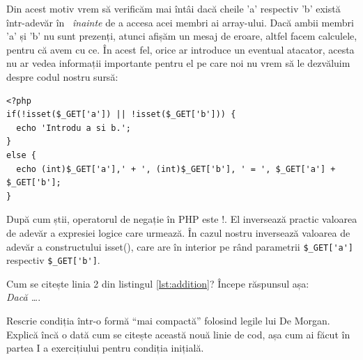 Din acest motiv vrem să verificăm mai întâi
dacă cheile 'a' respectiv 'b' există într-adevăr în \get\ \textit{înainte}
de a accesa acei membri ai array-ului. Dacă ambii membri 'a'
și 'b' nu sunt prezenți, atunci afișăm un mesaj de eroare,
altfel facem calculele, pentru că avem cu ce. În acest fel,
orice ar introduce un eventual atacator, acesta nu ar
vedea informații importante pentru el pe care noi nu vrem
să le dezvăluim despre codul nostru sursă:
\begin{lstlisting}[label=lst:addition,caption={Un calculator simplu}]
<?php
if(!isset($_GET['a']) || !isset($_GET['b'])) {
  echo 'Introdu a si b.';
}
else {
  echo (int)$_GET['a'],' + ', (int)$_GET['b'], ' = ', $_GET['a'] + $_GET['b'];
}
\end{lstlisting}
După cum știi, operatorul de negație în PHP este !. El inversează practic valoarea
de adevăr a expresiei logice care urmează. În cazul nostru inversează
valoarea de adevăr a constructului isset(),
care are în interior pe rând parametrii \verb|$_GET['a']| respectiv  \verb|$_GET['b']|.
\begin{Exercise}[title={Înțelege expresia logică},difficulty=1]
\ExePart
Cum se citește linia 2 din listingul \ref{lst:addition}? Începe răspunsul așa:\\
\textit{Dacă \ldots}.

\ExePart

Rescrie condiția într-o formă ``mai compactă'' folosind legile lui De Morgan.
Explică încă o dată cum se citește această nouă linie de cod, așa cum
ai făcut în partea I a exercițiului pentru condiția inițială.
\end{Exercise}


